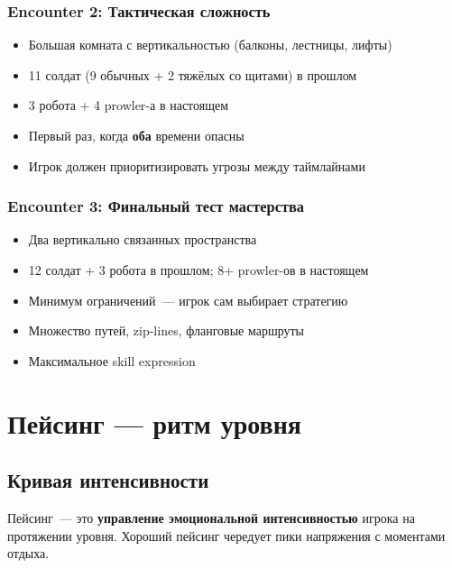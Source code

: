 \documentclass[a4paper,11pt]{report}
\begin{document}
\subsection{Encounter 2: Тактическая сложность}

\begin{itemize}[leftmargin=*]
  \item Большая комната с вертикальностью (балконы, лестницы, лифты)
  \item 11 солдат (9 обычных + 2 тяжёлых со щитами) в прошлом
  \item 3 робота + 4 prowler-а в настоящем
  \item Первый раз, когда \textbf{оба} времени опасны
  \item Игрок должен приоритизировать угрозы между таймлайнами
\end{itemize}

\subsection{Encounter 3: Финальный тест мастерства}

\begin{itemize}[leftmargin=*]
  \item Два вертикально связанных пространства
  \item 12 солдат + 3 робота в прошлом; 8+ prowler-ов в настоящем
  \item Минимум ограничений~--- игрок сам выбирает стратегию
  \item Множество путей, zip-lines, фланговые маршруты
  \item Максимальное skill expression
\end{itemize}


\chapter{Пейсинг --- ритм уровня}

\section{Кривая интенсивности}

Пейсинг~--- это \textbf{управление эмоциональной интенсивностью} игрока
на протяжении уровня. Хороший пейсинг чередует пики напряжения
с моментами отдыха.
\end{document}
